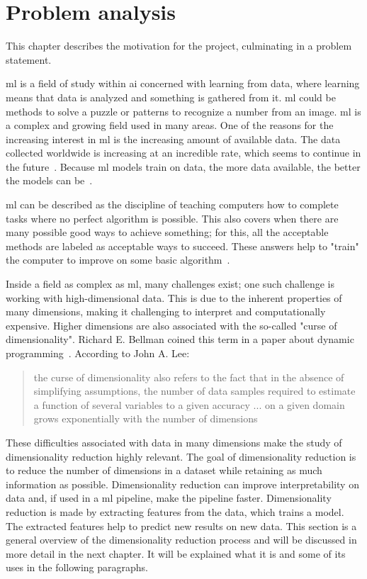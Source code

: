 \chapter{Problem analysis}\label{cha:problem-analysis}
This chapter describes the motivation for the project, culminating in a problem statement.

\gls{ml}  is a field of study within \gls{ai} concerned with learning from data, where learning means that data is analyzed and something is gathered from it. \gls{ml}  could be methods to solve a puzzle or patterns to recognize a number from an image. \gls{ml}  is a complex and growing field used in many areas. One of the reasons for the increasing interest in \gls{ml} is the increasing amount of available data. The data collected worldwide is increasing at an incredible rate, which seems to continue in the future~\cite{data-never-sleeps}. Because \gls{ml} models train on data, the more data available, the better the models can be~\cite{Unreasonable-effectiveness-of-data-Norvig}.

\gls{ml} can be described as the discipline of teaching computers how to complete tasks where no perfect algorithm is possible. This also covers when there are many possible good ways to achieve something; for this, all the acceptable methods are labeled as acceptable ways to succeed. These answers help to "train" the computer to improve on some basic algorithm~\cite{alpaydin2020introduction}.

Inside a field as complex as \gls{ml}, many challenges exist; one such challenge is working with high-dimensional data. This is due to the inherent properties of many dimensions, making it challenging to interpret and computationally expensive. Higher dimensions are also associated with the so-called "curse of dimensionality". Richard E. Bellman coined this term in a paper about dynamic programming~\cite{bellmanrand}. According to John A. Lee: \blockcquote{nonlinear-dim-red-chapter-two}{the curse of dimensionality also refers to the fact that in the absence of simplifying assumptions, the number of data samples required to estimate a function of several variables to a given accuracy ... on a given domain grows exponentially with the number of dimensions}.

These difficulties associated with data in many dimensions make the study of dimensionality reduction highly relevant. The goal of dimensionality reduction is to reduce the number of dimensions in a dataset while retaining as much information as possible. Dimensionality reduction can improve interpretability on data and, if used in a \gls{ml} pipeline, make the pipeline faster. Dimensionality reduction is made by extracting features from the data, which trains a model. The extracted features help to predict new results on new data. This section is a general overview of the dimensionality reduction process and will be discussed in more detail in the next chapter. It will be explained what it is and some of its uses in the following paragraphs.

